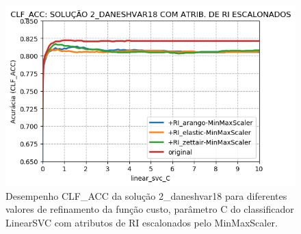 \begin{figure}[h]
    \centering
    \caption{Desempenho CLF\_ACC da solução 2\_daneshvar18 para diferentes valores de refinamento da função custo, parâmetro C do classificador LinearSVC com atributos de RI escalonados pelo MinMaxScaler.}
    \vspace{-0.0cm}
    \begin{center}
        \includegraphics[scale=0.75]{img/clf-acc-2-daneshvar18-ir-scaled.png}
    \end{center}
    \vspace{-0.0cm}
    \label{fig:clf-acc-2-daneshvar18-ir-scaled}
\end{figure}